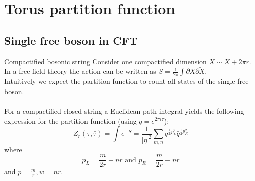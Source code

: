 \documentclass[11pt,aspectratio=169]{beamer}
\begin{document}
\section{Torus partition function}



\subsection{Single free boson in CFT}


\begin{frame}{\underline{Compactified bosonic string}}
	Consider one compactified dimension $X \sim X + 2\pi r$. In a free field theory the action can be written as 
	$S = \frac{1}{2\pi}\int \partial X \bar{\partial X}$.
	\\
	Intuitively we expect the partition function to count all states of the single free boson.
	\\~\\
	For a compactified closed string a Euclidean path integral yields the following expression for the partition function (using $q = e^{2\pi i \tau}$):
	\begin{equation}
		Z_r (\tau, \bar{\tau}) = \int e^{-S} = \frac{1}{|\eta|^2} \sum_{m, n} q^{\frac{1}{2}p_L^2}\bar{q}^{\frac{1}{2}p_R^2}
	\end{equation}
	where
	\begin{equation}
		p_L = \frac{m}{2r} + nr \textrm{ and }
		p_R = \frac{m}{2r} - nr
	\end{equation}
	and $p = \frac{m}{r}, w = nr$.

\end{frame}
\end{document}
